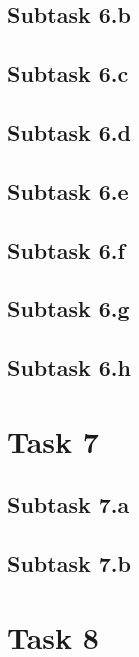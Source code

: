 \documentclass[a4paper,10pt]{article}
\begin{document}
\subsection*{Subtask 6.b}


\subsection*{Subtask 6.c}


\subsection*{Subtask 6.d}


\subsection*{Subtask 6.e}


\subsection*{Subtask 6.f}


\subsection*{Subtask 6.g}


\subsection*{Subtask 6.h}


\clearpage\newpage
\section*{Task 7}


\subsection*{Subtask 7.a}


\subsection*{Subtask 7.b}


\clearpage\newpage
\section*{Task 8}
\end{document}
